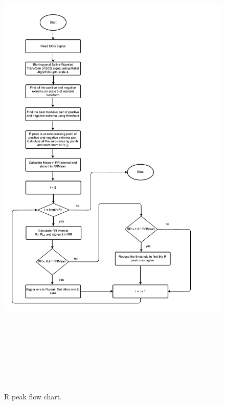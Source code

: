 \begin{figure}[htpb]
	\centering
	\includegraphics[width=25cm,height=24cm,keepaspectratio=true]{images/qrs.pdf}
	\caption{
		R peak flow chart.
	}
	\label{fig:r_peaks_flow_chart}
\end{figure}

